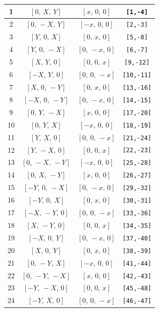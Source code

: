 \documentclass[fleqn,8pt]{jsarticle}
\begin{document}
\begin{longtable}{cccc}
1 & $\left[ 0,\, X,\, Y \right]$ & $\left[ x,\, 0,\, 0 \right]$ & {\tt [1,-4]} \\ \hline
2 & $\left[ 0,\, - X,\, Y \right]$ & $\left[ - x,\, 0,\, 0 \right]$ & {\tt [2,-3]} \\ \hline
3 & $\left[ Y,\, 0,\, X \right]$ & $\left[ 0,\, x,\, 0 \right]$ & {\tt [5,-8]} \\ \hline
4 & $\left[ Y,\, 0,\, - X \right]$ & $\left[ 0,\, - x,\, 0 \right]$ & {\tt [6,-7]} \\ \hline
5 & $\left[ X,\, Y,\, 0 \right]$ & $\left[ 0,\, 0,\, x \right]$ & {\tt [9,-12]} \\ \hline
6 & $\left[ - X,\, Y,\, 0 \right]$ & $\left[ 0,\, 0,\, - x \right]$ & {\tt [10,-11]} \\ \hline
7 & $\left[ X,\, 0,\, - Y \right]$ & $\left[ 0,\, x,\, 0 \right]$ & {\tt [13,-16]} \\ \hline
8 & $\left[ - X,\, 0,\, - Y \right]$ & $\left[ 0,\, - x,\, 0 \right]$ & {\tt [14,-15]} \\ \hline
9 & $\left[ 0,\, Y,\, - X \right]$ & $\left[ x,\, 0,\, 0 \right]$ & {\tt [17,-20]} \\ \hline
10 & $\left[ 0,\, Y,\, X \right]$ & $\left[ - x,\, 0,\, 0 \right]$ & {\tt [18,-19]} \\ \hline
11 & $\left[ Y,\, X,\, 0 \right]$ & $\left[ 0,\, 0,\, - x \right]$ & {\tt [21,-24]} \\ \hline
12 & $\left[ Y,\, - X,\, 0 \right]$ & $\left[ 0,\, 0,\, x \right]$ & {\tt [22,-23]} \\ \hline
13 & $\left[ 0,\, - X,\, - Y \right]$ & $\left[ - x,\, 0,\, 0 \right]$ & {\tt [25,-28]} \\ \hline
14 & $\left[ 0,\, X,\, - Y \right]$ & $\left[ x,\, 0,\, 0 \right]$ & {\tt [26,-27]} \\ \hline
15 & $\left[ - Y,\, 0,\, - X \right]$ & $\left[ 0,\, - x,\, 0 \right]$ & {\tt [29,-32]} \\ \hline
16 & $\left[ - Y,\, 0,\, X \right]$ & $\left[ 0,\, x,\, 0 \right]$ & {\tt [30,-31]} \\ \hline
17 & $\left[ - X,\, - Y,\, 0 \right]$ & $\left[ 0,\, 0,\, - x \right]$ & {\tt [33,-36]} \\ \hline
18 & $\left[ X,\, - Y,\, 0 \right]$ & $\left[ 0,\, 0,\, x \right]$ & {\tt [34,-35]} \\ \hline
19 & $\left[ - X,\, 0,\, Y \right]$ & $\left[ 0,\, - x,\, 0 \right]$ & {\tt [37,-40]} \\ \hline
20 & $\left[ X,\, 0,\, Y \right]$ & $\left[ 0,\, x,\, 0 \right]$ & {\tt [38,-39]} \\ \hline
21 & $\left[ 0,\, - Y,\, X \right]$ & $\left[ - x,\, 0,\, 0 \right]$ & {\tt [41,-44]} \\ \hline
22 & $\left[ 0,\, - Y,\, - X \right]$ & $\left[ x,\, 0,\, 0 \right]$ & {\tt [42,-43]} \\ \hline
23 & $\left[ - Y,\, - X,\, 0 \right]$ & $\left[ 0,\, 0,\, x \right]$ & {\tt [45,-48]} \\ \hline
24 & $\left[ - Y,\, X,\, 0 \right]$ & $\left[ 0,\, 0,\, - x \right]$ & {\tt [46,-47]} \\
\end{longtable}
\end{document}

